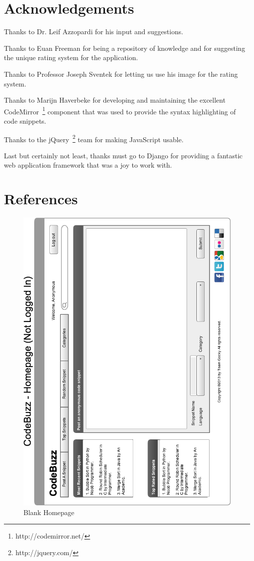 \documentclass{sig-alt-release2}
\begin{document}
\section{Acknowledgements}

Thanks to Dr. Leif Azzopardi for his input and suggestions.

Thanks to Euan Freeman for being a repository of knowledge and for
suggesting the unique rating system for the application.

Thanks to Professor Joseph Sventek for letting us use his image for the
rating system.

Thanks to Marijn Haverbeke for developing and maintaining the excellent
CodeMirror~\footnote{http://codemirror.net/} component that was used to
provide the syntax highlighting of code snippets.

Thanks to the jQuery~\footnote{http://jquery.com/} team for making
JavaScript usable.

Last but certainly not least, thanks must go to Django for providing
a fantastic web application framework that was a joy to work with.
\section{References}

\begin{figure}
\includegraphics[width=\textwidth]{../imgs/InitialHomepageHorz.png}
\caption{Blank Homepage}
\label{fig:blankPage}
\end{figure}
\end{document}
